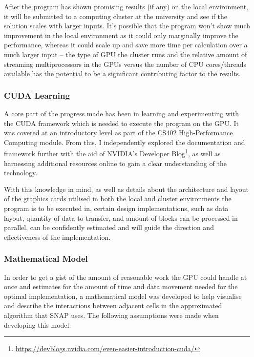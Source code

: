 \documentclass[conference]{IEEEtran}
\begin{document}
After the program has shown promising results (if any) on the local environment, it will be submitted to a computing cluster at the university and see if the solution scales with larger inputs. It’s possible that the program won’t show much improvement in the local environment as it could only marginally improve the performance, whereas it could scale up and save more time per calculation over a much larger input – the type of GPU the cluster runs and the relative amount of streaming multiprocessors in the GPUs versus the number of CPU cores/threads available has the potential to be a significant contributing factor to the results.


\subsubsection{CUDA Learning}

A core part of the progress made has been in learning and experimenting with the CUDA framework which is needed to execute the program on the GPU. It was covered at an introductory level as part of the CS402 High-Performance Computing module. From this, I independently explored the documentation and framework further with the aid of NVIDIA’s Developer Blog\footnote{\url{https://devblogs.nvidia.com/even-easier-introduction-cuda/}}, as well as harnessing additional resources online to gain a clear understanding of the technology.

With this knowledge in mind, as well as details about the architecture and layout of the graphics cards utilised in both the local and cluster environments the program is to be executed in, certain design implementations, such as data layout, quantity of data to transfer, and amount of blocks can be processed in parallel, can be confidently estimated and will guide the direction and effectiveness of the implementation.

\subsubsection{Mathematical Model}

In order to get a gist of the amount of reasonable work the GPU could handle at once and estimates for the amount of time and data movement needed for the optimal implementation, a mathematical model was developed to help visualise and describe the interactions between adjacent cells in the approximated algorithm that SNAP uses. The following assumptions were made when developing this model:
\end{document}
